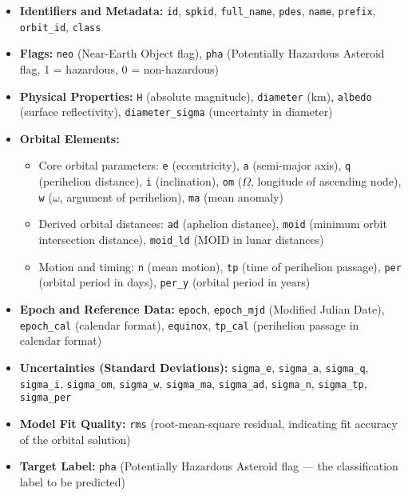 \documentclass[12pt]{article}
\begin{document}
\begin{itemize}
    \item \textbf{Identifiers and Metadata:} \texttt{id}, \texttt{spkid}, \texttt{full\_name}, \texttt{pdes}, \texttt{name}, \texttt{prefix}, \texttt{orbit\_id}, \texttt{class}

    \item \textbf{Flags:} \texttt{neo} (Near-Earth Object flag), \texttt{pha} (Potentially Hazardous Asteroid flag, 1 = hazardous, 0 = non-hazardous)

    \item \textbf{Physical Properties:} \texttt{H} (absolute magnitude), \texttt{diameter} (km), \texttt{albedo} (surface reflectivity), \texttt{diameter\_sigma} (uncertainty in diameter)

    \item \textbf{Orbital Elements:}
    \begin{itemize}
        \item Core orbital parameters: \texttt{e} (eccentricity), \texttt{a} (semi-major axis), \texttt{q} (perihelion distance), \texttt{i} (inclination), \texttt{om} ($\Omega$, longitude of ascending node), \texttt{w} ($\omega$, argument of perihelion), \texttt{ma} (mean anomaly)
        \item Derived orbital distances: \texttt{ad} (aphelion distance), \texttt{moid} (minimum orbit intersection distance), \texttt{moid\_ld} (MOID in lunar distances)
        \item Motion and timing: \texttt{n} (mean motion), \texttt{tp} (time of perihelion passage), \texttt{per} (orbital period in days), \texttt{per\_y} (orbital period in years)
    \end{itemize}

    \item \textbf{Epoch and Reference Data:} \texttt{epoch}, \texttt{epoch\_mjd} (Modified Julian Date), \texttt{epoch\_cal} (calendar format), \texttt{equinox}, \texttt{tp\_cal} (perihelion passage in calendar format)

    \item \textbf{Uncertainties (Standard Deviations):} \texttt{sigma\_e}, \texttt{sigma\_a}, \texttt{sigma\_q}, \texttt{sigma\_i}, \texttt{sigma\_om}, \texttt{sigma\_w}, \texttt{sigma\_ma}, \texttt{sigma\_ad}, \texttt{sigma\_n}, \texttt{sigma\_tp}, \texttt{sigma\_per}

    \item \textbf{Model Fit Quality:} \texttt{rms} (root-mean-square residual, indicating fit accuracy of the orbital solution)

    \item \textbf{Target Label:} \texttt{pha} (Potentially Hazardous Asteroid flag — the classification label to be predicted)
\end{itemize}
\end{document}
